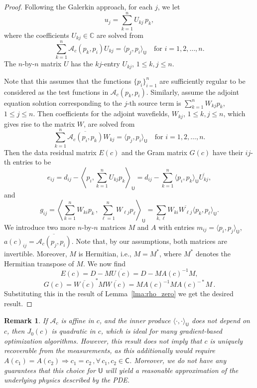 \documentclass[12pt]{amsart}
\newtheorem{rem}{Remark}
\begin{document}
\begin{proof}
Following the Galerkin approach, for each $j$, we let
\[
u_j = \sum_{k=1}^n U_{kj}\,p_k, 
\]
where the coefficients $U_{kj} \in \mathbb{C}$ are solved from
\[
\sum_{k=1}^n \mathcal{A}_c(p_k, p_i)U_{kj} = \langle p_j, p_i\rangle_\mathsf{U} \quad \text{for $i=1, 2, \ldots, n$}.
\]
The $n$-by-$n$ matrix $U$ has the $kj$-entry $U_{kj}$, $1\leq k,j \leq n$.

Note that this assumes that the functions $\{p_i\}_{i=1}^n$ are sufficiently regular to be considered as the test functions in $\mathcal{A}_c(p_k, p_i)$.
Similarly, assume the adjoint equation solution corresponding to the $j$-th source term is $\sum_{k=1}^n{W_{kj}} p_k $, $1\leq j \leq n$. Then coefficients  for the adjoint wavefields, $W_{kj}$, $1\leq k,j\leq n$, which gives rise to the matrix $W$, are solved from 
\[
\sum_{k=1}^n \overline{\mathcal{A}_c(p_i, p_k)}W_{kj} = \langle p_j, p_i\rangle_\mathsf{U} \quad \text{for $i=1, 2, \ldots, n$}.
\]
Then the data residual matrix $E(c)$ and the Gram matrix $G(c)$ have their $ij$-th entries to be
\[
e_{ij} = d_{ij} - \left\langle p_i, \sum_{k=1}^n U_{kj}p_k\right\rangle_{\mathsf{U}} = d_{ij} - \sum_{k=1}^n \langle p_i, p_k \rangle_\mathsf{U}\overline{U_{kj}},
\]
and
\[
g_{ij} = \left\langle \sum_{k=1}^n W_{ki}p_k\,,\, \sum_{\ell=1}^n W_{\ell j}p_\ell \right\rangle_\mathsf{U} = \sum_{k,\ell} W_{ki} \overline{W_{\ell j}} \langle p_k, p_\ell \rangle_\mathsf{U}.
\]
We introduce two more  $n$-by-$n$ matrices $M$ and $A$ 
 with entries $m_{ij} = \langle p_i, p_j \rangle_{\mathsf{U}}$, $a(c)_{ij} = \overline{\mathcal{A}_c(p_j, p_i)}$. Note that, by our assumptions, both matrices are invertible. Moreover, $M$ is Hermitian, i.e., $M = M^*$,  where $M^*$ denotes the Hermitian transpose of $M$. We now find
\[
E(c) = D - M\overline{U(c)} =  D - MA(c)^{-1}M,
\]
\[
G(c) = \overline{W(c)}^* M \overline{W(c)} = MA(c)^{-1}MA(c)^{-*}M\,.
\]
Substituting this in the result of Lemma~\ref{lma:rho_zero} we get the desired result.
\end{proof}

\begin{rem}\label{rem:quadratic}
If $\mathcal{A}_c$ is affine in $c$,  and the inner produce $\langle \cdot, \cdot \rangle_{\mathsf{U}}$ does not depend on $c$,  then $J_0(c)$ is \textit{quadratic} in $c$, which is ideal for many gradient-based optimization algorithms. However, this result does \emph{not} imply that $c$ is uniquely recoverable from the measurements, as this additionally would require $A(c_1) = A(c_2) \Rightarrow c_1 = c_2 \,, \forall \, c_1, c_2 \in \mathsf{C}$.  Moreover, we do not have any guarantees that this choice for $\mathsf{U}$ will yield a reasonable approximation of the underlying physics described by the PDE.
\end{rem}
\end{document}
